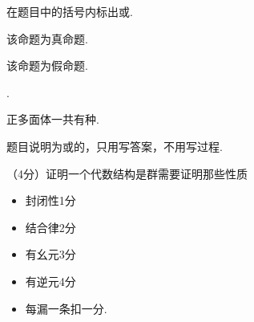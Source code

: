 \vspace{2cm}

在题目中的括号内标出或.

\begin{problem}
该命题为真命题.
\end{problem}

\begin{problem}
该命题为假命题.
\end{problem}

.

\begin{problem}
正多面体一共有\fillin{$\quad 5\quad $}种.
\end{problem}

\newpage
{}题目说明为或的，只用写答案，不用写过程.

\begin{problem}
（4分）证明一个代数结构是群需要证明那些性质
\end{problem}
\bigskip
\begin{solution}
\begin{itemize}
    \item 封闭性\dotfill 1分
    \item 结合律\dotfill 2分
    \item 有幺元\dotfill 3分
    \item 有逆元\dotfill 4分
\end{itemize}
\end{solution}
\begin{note}
\begin{itemize}
    \item 每漏一条扣一分. 
\end{itemize}
\end{note}

